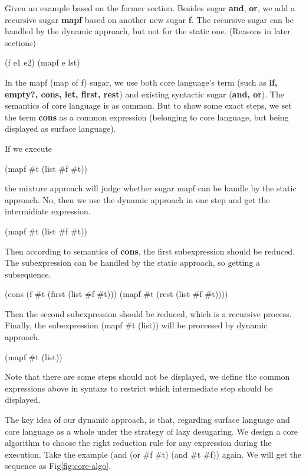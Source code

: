 Given an example based on the former section. Besides sugar {\bfseries and}, {\bfseries or}, we add a recursive sugar {\bfseries mapf} based on another new sugar {\bfseries f}. The recursive sugar can be handled by the dynamic approach, but not for the static one. (Reasons in later sections)
\begin{Codes}
\small{(f e1 e2)} 
\small{(mapf e lst)}  
\end{Codes}

In the mapf (map of f) sugar, we use both core language's term (such as {\bfseries if, empty?, cons, let, first, rest}) and existing syntactic sugar ({\bfseries and, or}). The semantics of core language is as common. But to show some exact steps, we set the term {\bfseries cons} as a common expression (belonging to core language, but being displayed as surface language).


If we execute 
\begin{Codes}
(mapf \#t (list \#f \#t))
\end{Codes}
 the mixture approach will judge whether sugar mapf can be handle by the static approach. No, then we use the dynamic approach in one step and get the intermidiate expression.
\begin{Codes}
    (mapf \#t (list \#f \#t))
\end{Codes}
Then according to semantics of {\bfseries cons}, the first subexpression should be reduced. The subexpression can be handled by the static approach, so getting a subsequence.
\begin{Codes}
    (cons (f \#t (first (list \#f \#t))) (mapf \#t (rest (list \#f \#t))))
\end{Codes}
Then the second subexpression should be reduced, which is a recursive process. Finally, the subexpression (mapf \#t (list)) will be processed by dynamic approach.
\begin{Codes}
   (mapf \#t (list))
\end{Codes}
Note that there are some steps should not be displayed, we define the common expressions above in syntaxs to restrict which intermediate step should be displayed.


The key idea of our dynamic approach, is that, regarding surface language and core language as a whole under the strategy of lazy desugaring. We design a core algorithm to choose the right reduction rule for any expression during the execution. Take the example 
(and (or \#f \#t) (and \#t \#f)) again. We will get the sequence as Fig\ref{fig:core-algo}.

